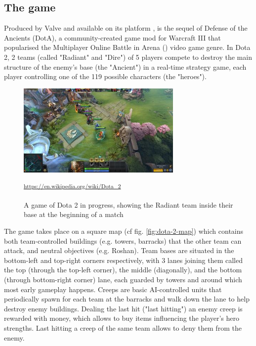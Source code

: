 \subsection{The game}

Produced by Valve and available on its platform ,  is the sequel of Defense of the Ancients (DotA), a community-created game mod for Warcraft III that popularised the Multiplayer Online Battle in Arena () video game genre. In Dota 2, 2 teams (called "Radiant" and "Dire") of 5 players compete to destroy the main structure of the enemy's base (the "Ancient") in a real-time strategy game, each player controlling one of the 119 possible characters (the "heroes").

\begin{figure}[H]
 \centering
 \captionsetup{justification=centering, margin=0.5cm}
 \includegraphics[width=8cm]{images/Dota_2_Gameplay_Aug_2017.jpg}
\caption{A game of Dota 2 in progress, showing the Radiant team inside their base at the beginning of a match}
 \small\textsuperscript{\url{https://en.wikipedia.org/wiki/Dota_2}}
 \label{fig:dota-2-game}
\end{figure}

The game takes place on a square map (cf fig. \ref{fig:dota-2-map}) which contains both team-controlled buildings (e.g. towers, barracks) that the other team can attack, and neutral objectives (e.g. Roshan). Team bases are situated in the bottom-left and top-right corners respectively, with 3 lanes joining them called the top (through the top-left corner), the middle (diagonally), and the bottom (through bottom-right corner) lane, each guarded by towers and around which most early gameplay happens. Creeps are basic AI-controlled units that periodically spawn for each team at the barracks and walk down the lane to help destroy enemy buildings. Dealing the last hit ("last hitting") an enemy creep is rewarded with money, which allows to buy items influencing the player's hero strengths. Last hitting a creep of the same team allows to deny them from the enemy. 

